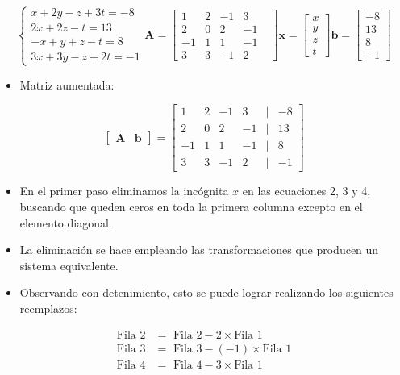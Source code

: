 \documentclass[openany]{book}
\providecommand{\tightlist}{%
  \setlength{\itemsep}{0pt}\setlength{\parskip}{0pt}}
\begin{document}
\[
\begin{cases} 
x+2y-z+3t=-8 \\
2x+2z-t=13 \\
-x+y+z-t=8\\
3x+3y-z+2t = -1
\end{cases}
\mathbf{A}=
\begin{bmatrix}
1 & 2 & -1 & 3 \\
2 & 0 & 2 & -1 \\
-1 & 1 & 1 & -1 \\
3 & 3 & -1 & 2 &  
\end{bmatrix}
\mathbf{x} = 
\begin{bmatrix}
x \\ y \\ z \\ t
\end{bmatrix}
\mathbf{b} =
\begin{bmatrix}
-8 \\ 13 \\ 8 \\ -1
\end{bmatrix}
\]

\begin{itemize}
\tightlist
\item
  Matriz aumentada:
\end{itemize}

\[
\begin{bmatrix}
    \mathbf{A} & \mathbf{b}
\end{bmatrix}
=
\begin{bmatrix}
    1 & 2 & -1 & 3 &|& -8\\
    2 & 0 & 2 & -1 &|& 13\\
    -1 & 1 & 1 & -1 &|& 8\\
    3 & 3 & -1 & 2 &|& -1  
\end{bmatrix}
\]

\begin{itemize}
\tightlist
\item
  En el primer paso eliminamos la incógnita \(x\) en las ecuaciones 2, 3 y 4, buscando que queden ceros en toda la primera columna excepto en el elemento diagonal.
\item
  La eliminación se hace empleando las transformaciones que producen un sistema equivalente.
\item
  Observando con detenimiento, esto se puede lograr realizando los siguientes reemplazos:
\end{itemize}

\[
\begin{array}{cl}
\text{Fila 2} &= \text{ Fila 2} - 2 \times \text{Fila 1} \\ 
\text{Fila 3} &= \text{ Fila 3} - (-1) \times \text{Fila 1} \\
\text{Fila 4} &= \text{ Fila 4} - 3 \times \text{Fila 1} 
\end{array}
\]
\end{document}
